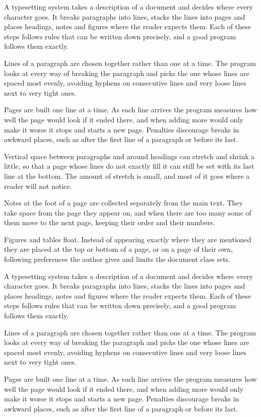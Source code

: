 \documentclass{article}
\begin{document}
\thispagestyle{empty}
A typesetting system takes a description of a document and decides where every character goes. It breaks paragraphs into lines, stacks the lines into pages and places headings, notes and figures where the reader expects them. Each of these steps follows rules that can be written down precisely, and a good program follows them exactly.

Lines of a paragraph are chosen together rather than one at a time. The program looks at every way of breaking the paragraph and picks the one whose lines are spaced most evenly, avoiding hyphens on consecutive lines and very loose lines next to very tight ones.

Pages are built one line at a time. As each line arrives the program measures how well the page would look if it ended there, and when adding more would only make it worse it stops and starts a new page. Penalties discourage breaks in awkward places, such as after the first line of a paragraph or before its last.

Vertical space between paragraphs and around headings can stretch and shrink a little, so that a page whose lines do not exactly fill it can still be set with its last line at the bottom. The amount of stretch is small, and most of it goes where a reader will not notice.

Notes at the foot of a page are collected separately from the main text. They take space from the page they appear on, and when there are too many some of them move to the next page, keeping their order and their numbers.

Figures and tables float. Instead of appearing exactly where they are mentioned they are placed at the top or bottom of a page, or on a page of their own, following preferences the author gives and limits the document class sets.

A typesetting system takes a description of a document and decides where every character goes. It breaks paragraphs into lines, stacks the lines into pages and places headings, notes and figures where the reader expects them. Each of these steps follows rules that can be written down precisely, and a good program follows them exactly.

Lines of a paragraph are chosen together rather than one at a time. The program looks at every way of breaking the paragraph and picks the one whose lines are spaced most evenly, avoiding hyphens on consecutive lines and very loose lines next to very tight ones.

Pages are built one line at a time. As each line arrives the program measures how well the page would look if it ended there, and when adding more would only make it worse it stops and starts a new page. Penalties discourage breaks in awkward places, such as after the first line of a paragraph or before its last.
\end{document}
